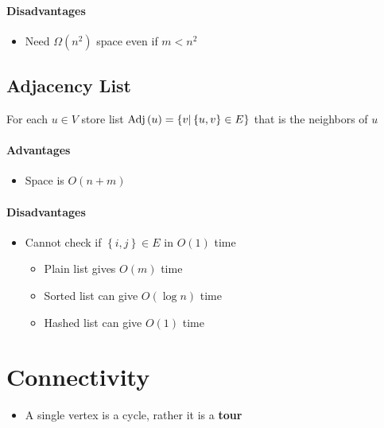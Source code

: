     \paragraph{Disadvantages}
    \begin{itemize}
      \item Need $ \Omega\left( n^{2} \right) $ space even if $ m < n^{2} $
    \end{itemize}

  \subsection{Adjacency List}

    For each $ u \in V $ store list
    $ \operatorname{Adj}\left( u \right) = \left\{ v | \left\{ u, v \right\} \in E \right\} $
    that is the neighbors of $ u $

    \paragraph{Advantages}
    \begin{itemize}
      \item Space is $ O\left( n + m \right) $
    \end{itemize}

    \paragraph{Disadvantages}
    \begin{itemize}
      \item Cannot check if $ \left\{ i, j \right\} \in E $ in
      $ O\left( 1 \right) $ time
      \begin{itemize}
        \item Plain list gives $ O\left( m \right) $ time
        \item Sorted list can give $ O\left( \log n \right) $ time
        \item Hashed list can give $ O\left( 1 \right) $ time
      \end{itemize}
    \end{itemize}

\section{Connectivity}

  \begin{itemize}
    \item A single vertex is a cycle, rather it is a \textbf{tour}
  \end{itemize}

